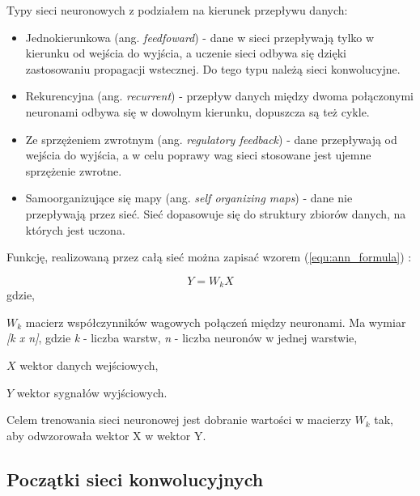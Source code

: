 {\parindent0pt %
Typy sieci neuronowych z podziałem na kierunek przepływu danych:
\begin{itemize}
\item{Jednokierunkowa (ang. \textit{feedfoward}) - dane w sieci przepływają tylko w kierunku od wejścia do wyjścia, a uczenie sieci odbywa się dzięki zastosowaniu propagacji wstecznej. Do tego typu należą sieci konwolucyjne.}
\item{Rekurencyjna (ang. \textit{recurrent}) - przepływ danych między dwoma połączonymi neuronami odbywa się w dowolnym kierunku, dopuszcza są też cykle.}
\item{Ze sprzężeniem zwrotnym (ang. \textit{regulatory feedback}) - dane przepływają od wejścia do wyjścia, a w celu poprawy wag sieci stosowane jest ujemne sprzężenie zwrotne.}
\item{Samoorganizujące się mapy (ang. \textit{self organizing maps}) - dane nie przepływają przez sieć. Sieć dopasowuje się do struktury zbiorów danych, na których jest uczona.}
\end{itemize}

Funkcję, realizowaną przez całą sieć można zapisać wzorem (\ref{equ:ann_formula}) \cite{tadeusiewicz_sn}:

\begin{equation}
Y = W_k X
\label{equ:ann_formula}
\end{equation}
gdzie,
\begin{eqwhere}[2cm]
	\item[$W_k$] macierz współczynników wagowych połączeń między neuronami. Ma wymiar \textit{[k x n]}, gdzie \textit{k} - liczba warstw, \textit{n} - liczba neuronów w jednej warstwie,
	\item[$X$] wektor danych wejściowych,
	\item[$Y$] wektor sygnałów wyjściowych.
\end{eqwhere}

Celem trenowania sieci neuronowej jest dobranie wartości w macierzy \textit{$W_k$} tak, aby odwzorowała wektor X w wektor Y. 
}
\subsection{Początki sieci konwolucyjnych}

